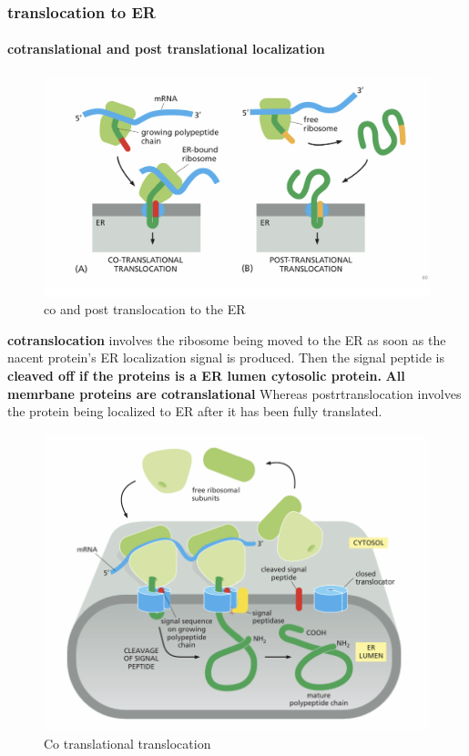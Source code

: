 \documentclass[../main.tex]{subfiles}
\begin{document}
\subsubsection{translocation to ER}

\paragraph{cotranslational and post translational localization}
\begin{figure}[H]
    \centering
    \includegraphics[width=1\linewidth]{CoTranslation.png}
    \caption{co and post translocation to the ER}
    \label{fig:enter-label}
\end{figure}

\textbf{\gls{cotranslocation}} involves the ribosome being moved to the ER as soon as the nacent protein's ER localization signal is produced. Then the signal peptide is\textbf{ cleaved off if the proteins is a ER lumen cytosolic protein.} \textbf{All memrbane proteins are cotranslational} Whereas \gls{postrtranslocation} involves the protein being localized to ER after it has been fully translated.
\begin{figure}[H]
    \centering
    \includegraphics[width=0.5\linewidth]{cotranslation.png}
    \caption{Co translational translocation}
    \label{fig:enter-label}
\end{figure}
\end{document}
